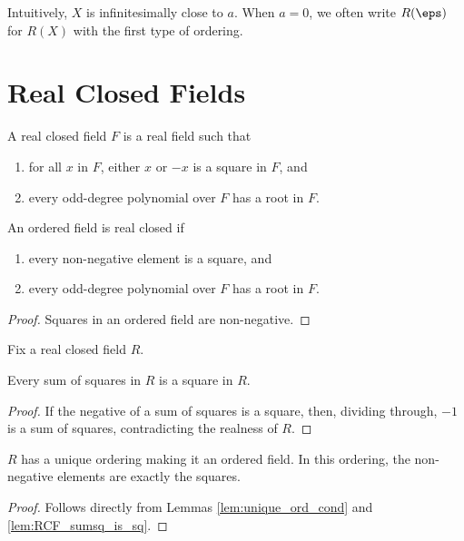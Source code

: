 Intuitively, $X$ is infinitesimally close to $a$. When $a=0$, we often write $R(\eps)$ for $R(X)$ with the first type of ordering.

\section{Real Closed Fields}

\begin{definition}
  \label{def:RCF}
  \mathlibok
  A real closed field $F$ is a real field such that
  \begin{enumerate}
    \item for all $x$ in $F$, either $x$ or $-x$ is a square in $F$, and
    \item every odd-degree polynomial over $F$ has a root in $F$.
  \end{enumerate}
\end{definition}

\begin{lemma}
  \label{lem:RCF_ord_ax}
  \mathlibok
  An ordered field is real closed if
  \begin{enumerate}
    \item every non-negative element is a square, and
    \item every odd-degree polynomial over $F$ has a root in $F$.
  \end{enumerate}
\end{lemma}
\begin{proof}
  \mathlibok
  Squares in an ordered field are non-negative.
\end{proof}

Fix a real closed field $R$.

\begin{lemma}
  \label{lem:RCF_sumsq_is_sq}
  Every sum of squares in $R$ is a square in $R$.
\end{lemma}
\begin{proof}
  If the negative of a sum of squares is a square, then, dividing through, $-1$ is a sum of squares, contradicting the realness of $R$.
\end{proof}

\begin{lemma}
  \label{lem:RCF_ord_unique}
  \mathlibok
  $R$ has a unique ordering making it an ordered field. In this ordering, the non-negative elements are exactly the squares.
\end{lemma}
\begin{proof}
  \mathlibok
  Follows directly from Lemmas \ref{lem:unique_ord_cond} and \ref{lem:RCF_sumsq_is_sq}.
\end{proof}

